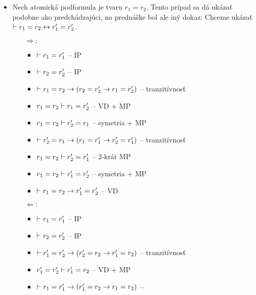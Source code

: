 \begin{dokaz}
\begin{itemize}
\begin{itemize}
\begin{itemize}
\begin{itemize}
                \end{itemize}
            \end{itemize}
        \item Nech atomická podformula je tvaru $r_1 = r_2$. 
        Tento prípad sa dá ukázať podobne ako predchádzajúci,
        na prednáške bol ale iný dokaz:
        Chceme ukázať $\vdash r_1=r_2 \leftrightarrow r_1'=r_2'$.
            \begin{itemize}
            \item[$\Rightarrow:$]
                \begin{itemize}
                \item $\vdash r_1=r_1'$ -- IP
                \item $\vdash r_2=r_2'$ -- IP
                \item $\vdash r_1 = r_2 \rightarrow (
                            r_2 = r_2' \rightarrow r_1 = r_2')$ --
                            tranzitívnosť
                \item $r_1=r_2 \vdash r_1=r_2'$ -- VD + MP
                \item $r_1=r_2 \vdash r_2'=r_1$ -- symetria + MP
                \item $\vdash r_2' = r_1 \rightarrow (
                            r_1 = r_1' \rightarrow r_2' = r_1')$ --
                            tranzitívnosť
                \item $r_1=r_2 \vdash r_2' = r_1'$ -- 2-krát MP
                \item $r_1=r_2 \vdash r_1' = r_2'$ -- symetria + MP
                \item $\vdash r_1=r_2 \rightarrow r_1'=r_2'$ -- VD
                \end{itemize}
            \item[$\Leftarrow:$]
                \begin{itemize}
                \item $\vdash r_1=r_1'$ -- IP
                \item $\vdash r_2=r_2'$ -- IP
                \item $\vdash r_1' = r_2' \rightarrow (
                            r_2' = r_2 \rightarrow r_1' = r_2)$ --
                            tranzitívnosť
                \item $r_1'=r_2' \vdash r_1'=r_2$ -- VD + MP
                \item $\vdash r_1 = r_1' \rightarrow (
                            r_1' = r_2 \rightarrow r_1 = r_2)$ --

\end{itemize}
\end{itemize}
\end{itemize}
\end{itemize}
\end{dokaz}
